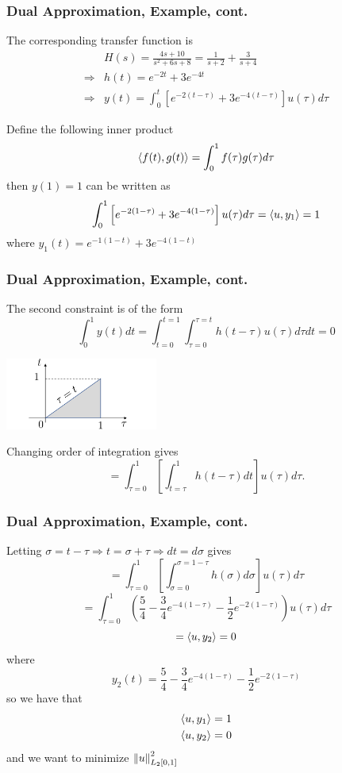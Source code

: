 \documentclass{beamer}
\begin{document}
\begin{frame}\frametitle{Dual Approximation, Example, cont.}
	The corresponding transfer function is
	\begin{align*}
	& H(s) = \frac{4s + 10}{s^2 + 6s + 8} = \frac{1}{s+2} + \frac{3}{s+4} \\
	\Rightarrow & h(t) = e^{-2t} + 3e^{-4t} \\
	\Rightarrow & y(t) = \int_0^t\left[e^{-2(t-\tau)} + 3e^{-4(t-\tau)}\right]u(\tau) d\tau 
	\end{align*}
	
	\vfill
	
	Define the following inner product
	\[ 
	\left<f(t), g(t)\right> = \int_0^1 f(\tau)g(\tau)d\tau 
	\]
	then $y(1) = 1$ can be written as
	\[ \int_0^1 \left[ e^{-2(1-\tau)} + 3e^{-4(1-\tau)}\right]u(\tau)d\tau =
	\left< u,y_1\right> = 1 \]
	where $y_1(t) = e^{-1(1-t)}+3e^{-4(1-t)}$
\end{frame}

\begin{frame}\frametitle{Dual Approximation, Example, cont.}
	The second constraint is of the form 
	\[ \int_0^1 y(t)dt = \int_{t=0}^{t=1} \int_{\tau = 0}^{\tau = t}h(t -
	\tau)u(\tau)d\tau dt = 0 \]
	
	\begin{center}
	\includegraphics[width=5cm]{figures/chap3_change_of_variables}
	\end{center}
	
	Changing order of integration gives
	\[ = \int_{\tau = 0}^{1}\left[\int_{t = \tau}^{1}
	h(t-\tau)dt\right]u(\tau)d\tau. \]

\end{frame}

\begin{frame}\frametitle{Dual Approximation, Example, cont.}	
	Letting $\sigma = t - \tau \Rightarrow t = \sigma + \tau \Rightarrow
	dt = d\sigma$ gives
	\[ = \int_{\tau = 0}^{1} \left[ \int_{\sigma=0}^{\sigma=1-\tau}
	h(\sigma)d\sigma \right] u(\tau) d\tau \]
	\[ = \int_{\tau = 0}^{1}\left( \frac{5}{4} -
	\frac{3}{4}e^{-4(1-\tau)}-\frac{1}{2}e^{-2(1-\tau)}\right)u(\tau)d\tau \]
	\[ = \left<u,y_2 \right> = 0\]
	where 
	\[y_2(t) = \frac{5}{4} -\frac{3}{4}e^{-4(1-\tau)}-\frac{1}{2}e^{-2(1-\tau)} \]
	so we have that 
	\begin{align*}
	\left<u,y_1 \right> &= 1\\
	\left<u,y_2 \right>&= 0
	\end{align*}
	and we want to minimize $\left\|u \right\|^2_{L_2[0,1]}$
\end{frame}
	
\end{document}
